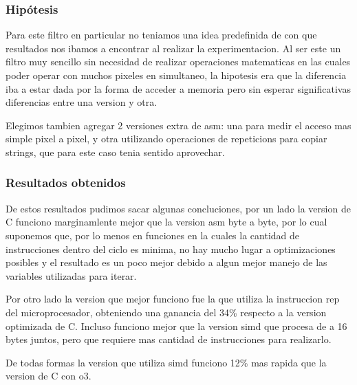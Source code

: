 \subsubsection{Hipótesis}
Para este filtro en particular no teniamos una idea predefinida de con que resultados nos ibamos a encontrar al realizar la experimentacion.
Al ser este un filtro muy sencillo sin necesidad de realizar operaciones matematicas en las cuales poder operar con muchos pixeles en simultaneo, la hipotesis era que la diferencia iba a estar dada por la forma de acceder a memoria pero sin esperar significativas diferencias entre una version y otra.

Elegimos tambien agregar 2 versiones extra de asm: una para medir el acceso mas simple pixel a pixel, y otra utilizando operaciones de repeticions para copiar strings, que para este caso tenia sentido aprovechar.

\subsubsection{Resultados obtenidos}

De estos resultados pudimos sacar algunas concluciones, por un lado la version de C funciono marginamlente mejor que la version asm byte a byte, por lo cual suponemos que, por lo menos en funciones en la cuales la cantidad de instrucciones dentro del ciclo es minima, no hay mucho lugar a optimizaciones posibles y el resultado es un poco mejor debido a algun mejor manejo de las variables utilizadas para iterar.

Por otro lado la version que mejor funciono fue la que utiliza la instruccion rep del microprocesador, obteniendo una ganancia del 34\% respecto a la version optimizada de C.
Incluso funciono mejor que la version simd que procesa de a 16 bytes juntos, pero que requiere mas cantidad de instrucciones para realizarlo.

De todas formas la version que utiliza simd funciono 12\% mas rapida que la version  de C con o3.


